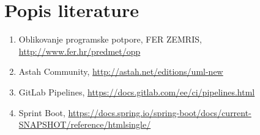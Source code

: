 \chapter*{Popis literature}
	 	
 		\begin{enumerate}
			
			
			\item  Oblikovanje programske potpore, FER ZEMRIS, \url{http://www.fer.hr/predmet/opp}
			
			\item Astah Community, \url{http://astah.net/editions/uml-new}
			\item GitLab Pipelines, \url{https://docs.gitlab.com/ee/ci/pipelines.html}
			\item Sprint Boot, \url{https://docs.spring.io/spring-boot/docs/current-SNAPSHOT/reference/htmlsingle/}
		\end{enumerate}
		
		 